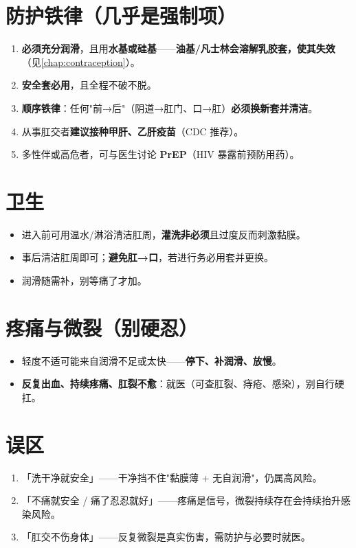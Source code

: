 \section{防护铁律（几乎是强制项）}

\begin{enumerate}[leftmargin=2em,itemsep=0.3em]
  \item \textbf{必须充分润滑}，且用\textbf{水基或硅基}——\textbf{油基/凡士林会溶解乳胶套，使其失效}（见\ref{chap:contraception}）。
  \item \textbf{安全套必用}，且全程不破不脱。
  \item \textbf{顺序铁律}：任何"前→后"（阴道→肛门、口→肛）\textbf{必须换新套并清洁}。
  \item 从事肛交者\textbf{建议接种甲肝、乙肝疫苗}（CDC 推荐）。
  \item 多性伴或高危者，可与医生讨论 \textbf{PrEP}（HIV 暴露前预防用药）。
\end{enumerate}

\section{卫生}

\begin{itemize}[leftmargin=2em,itemsep=0.3em]
  \item 进入前可用温水/淋浴清洁肛周，\textbf{灌洗非必须}且过度反而刺激黏膜。
  \item 事后清洁肛周即可；\textbf{避免肛→口}，若进行务必用套并更换。
  \item 润滑随需补，别等痛了才加。
\end{itemize}

\section{疼痛与微裂（别硬忍）}

\begin{itemize}[leftmargin=2em,itemsep=0.3em]
  \item 轻度不适可能来自润滑不足或太快——\textbf{停下、补润滑、放慢}。
  \item \textbf{反复出血、持续疼痛、肛裂不愈}：就医（可查肛裂、痔疮、感染），别自行硬扛。
\end{itemize}

\section{误区}

\begin{enumerate}[leftmargin=2em,itemsep=0.3em]
  \item 「洗干净就安全」——干净挡不住"黏膜薄 + 无自润滑"，仍属高风险。
  \item 「不痛就安全 / 痛了忍忍就好」——疼痛是信号，微裂持续存在会持续抬升感染风险。
  \item 「肛交不伤身体」——反复微裂是真实伤害，需防护与必要时就医。
\end{enumerate}

